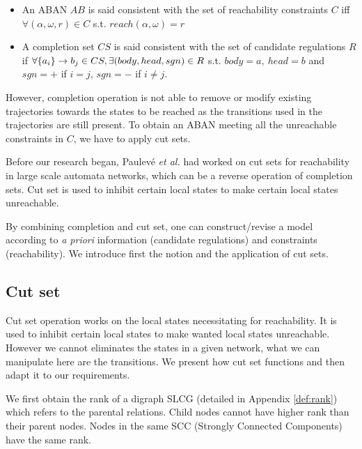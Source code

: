 \begin{definition}[Consistency]\label{def:consistencyFirst}
\leavevmode
\makeatletter
\@nobreaktrue
\makeatother
\begin{itemize}
    \item An ABAN $AB$ is said consistent with the set of reachability constraints $C$ iff $\forall (\alpha,\omega,r)\in C$ s.t. $reach(\alpha,\omega)=r$
    \item A completion set $CS$ is said consistent with the set of candidate regulations $R$ if $\forall \acm{a_i}{b_{1-j}}{b_j}\in CS, \exists (body,head,sgn)\in R$ s.t. $body=a,\ head=b$ and $sgn=+$ if $i=j$, $sgn=-$ if $i\neq j$. 
\end{itemize}
    
\end{definition}

However, completion operation is not able to remove or modify existing trajectories towards the states to be reached as the transitions used in the trajectories are still present.
To obtain an ABAN meeting all the unreachable constraints in $C$, we have to apply cut sets.

Before our research began, Paulev\'e \textit{et al.} \cite{PAK13-CAV} had worked on cut sets for reachability in large scale automata networks, which can be a reverse operation of completion sets.
Cut set is used to inhibit certain local states to make certain local states unreachable.

By combining completion and cut set, one can construct/revise a model according to \textit{a priori} information (candidate regulations) and constraints (reachability).
We introduce first the notion and the application of cut sets.

\subsection{Cut set}\label{sec:cutsetModelInfer}

Cut set operation works on the local states necessitating for reachability. 
It is used to inhibit certain local states to make wanted local states unreachable.
However we cannot eliminates the states in a given network, what we can manipulate here are the transitions. 
We present how cut set functions and then adapt it to our requirements.

We first obtain the rank of a digraph SLCG (detailed in Appendix \ref{def:rank}) which refers to the parental relations.
Child nodes cannot have higher rank than their parent nodes.
Nodes in the same SCC (Strongly Connected Components) have the same rank.

